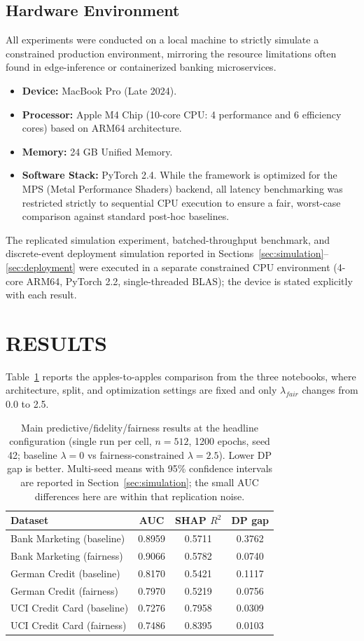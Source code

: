 \documentclass{wscpaperproc}
\theoremstyle{wsc}
\begin{document}
\subsection{Hardware Environment}
All experiments were conducted on a local machine to strictly simulate a constrained production environment, mirroring the resource limitations often found in edge-inference or containerized banking microservices.
\begin{itemize}
    \item \textbf{Device:} MacBook Pro (Late 2024).
    \item \textbf{Processor:} Apple M4 Chip (10-core CPU: 4 performance and 6 efficiency cores) based on ARM64 architecture. 
    \item \textbf{Memory:} 24 GB Unified Memory.
    \item \textbf{Software Stack:} PyTorch 2.4. While the framework is optimized for the MPS (Metal Performance Shaders) backend, all latency benchmarking was restricted strictly to sequential CPU execution to ensure a fair, worst-case comparison against standard post-hoc baselines.
\end{itemize}
The replicated simulation experiment, batched-throughput benchmark, and discrete-event deployment simulation reported in Sections~\ref{sec:simulation}--\ref{sec:deployment} were executed in a separate constrained CPU environment (4-core ARM64, PyTorch 2.2, single-threaded BLAS); the device is stated explicitly with each result.

\section{RESULTS}
\label{sec:results}
Table~\ref{tab:main_results} reports the apples-to-apples comparison from the three notebooks, where architecture, split, and optimization settings are fixed and only $\lambda_{fair}$ changes from 0.0 to 2.5.

\begin{table}[htb]
\centering
\caption{Main predictive/fidelity/fairness results at the headline configuration (single run per cell, $n=512$, 1200 epochs, seed 42; baseline $\lambda{=}0$ vs fairness-constrained $\lambda{=}2.5$). Lower DP gap is better. Multi-seed means with 95\% confidence intervals are reported in Section~\ref{sec:simulation}; the small AUC differences here are within that replication noise.}
\label{tab:main_results}
\begin{tabular}{lccc}
\hline
Dataset & AUC & SHAP $R^2$ & DP gap \\ \hline
Bank Marketing (baseline) & 0.8959 & 0.5711 & 0.3762 \\
Bank Marketing (fairness) & 0.9066 & 0.5782 & 0.0740 \\
German Credit (baseline) & 0.8170 & 0.5421 & 0.1117 \\
German Credit (fairness) & 0.7970 & 0.5219 & 0.0756 \\
UCI Credit Card (baseline) & 0.7276 & 0.7958 & 0.0309 \\
UCI Credit Card (fairness) & 0.7486 & 0.8395 & 0.0103 \\ \hline
\end{tabular}
\end{table}
\end{document}
